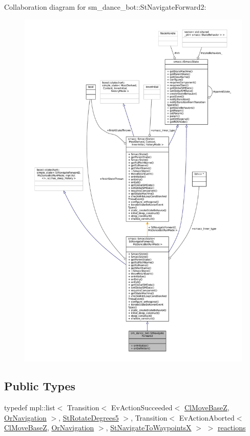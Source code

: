 Collaboration diagram for sm\+\_\+dance\+\_\+bot\+:\+:St\+Navigate\+Forward2\+:
\nopagebreak
\begin{figure}[H]
\begin{center}
\leavevmode
\includegraphics[width=350pt]{structsm__dance__bot_1_1StNavigateForward2__coll__graph}
\end{center}
\end{figure}
\subsection*{Public Types}
\begin{DoxyCompactItemize}
\item 
typedef mpl\+::list$<$ Transition$<$ Ev\+Action\+Succeeded$<$ \hyperlink{classmove__base__z__client_1_1ClMoveBaseZ}{Cl\+Move\+BaseZ}, \hyperlink{classsm__dance__bot_1_1OrNavigation}{Or\+Navigation} $>$, \hyperlink{structsm__dance__bot_1_1StRotateDegrees5}{St\+Rotate\+Degrees5} $>$, Transition$<$ Ev\+Action\+Aborted$<$ \hyperlink{classmove__base__z__client_1_1ClMoveBaseZ}{Cl\+Move\+BaseZ}, \hyperlink{classsm__dance__bot_1_1OrNavigation}{Or\+Navigation} $>$, \hyperlink{structsm__dance__bot_1_1StNavigateToWaypointsX}{St\+Navigate\+To\+WaypointsX} $>$ $>$ \hyperlink{structsm__dance__bot_1_1StNavigateForward2_ac9a6d0e0aa772d68bcb6d7932a21463a}{reactions}
\end{DoxyCompactItemize}
